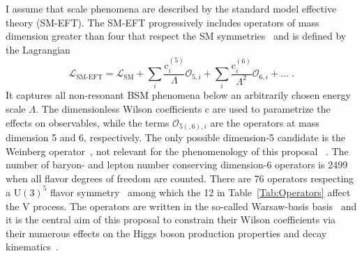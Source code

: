 \documentclass[a4paper,11pt]{article}
\renewcommand{\PV}{{{{V}}}\xspace}
\newcommand{\VH}{{{\PV}{\PH}}\xspace}
\begin{document}
I assume that \TeV scale phenomena are described by the standard model effective theory (SM-EFT). 
The SM-EFT progressively includes operators of mass dimension greater than four that respect the SM symmetries~\cite{Jenkins:2013zja,Alonso:2013hga,Jenkins:2013wua,Englert:2014cva,Brivio:2017vri} and is defined by the Lagrangian
\begin{equation}
\mathcal{L}_{\text{SM-EFT}} = \mathcal{L}_{\text{SM}} +  {\sum}_{i} \frac{\text{c}_i^{\left(5\right)}}{\Lambda} \mathcal{O}_{5,i} + {\sum}_{i} \frac{\text{c}_i^{\left(6\right)}}{{\Lambda}^{2}} \mathcal{O}_{6,i} + ... \;.
\label{Eq:SMEFT}
\end{equation}
It captures all non-resonant BSM phenomena below an arbitrarily chosen energy scale $\Lambda$.
The dimensionless Wilson coefficients $\text{c}$ are used to parametrize the effects on observables, while the terms $\mathcal{O}_{5(,6),i}$ are  the operators at mass dimension 5 and 6, respectively.
The only possible dimension-5 candidate is the  Weinberg operator~\cite{PhysRevLett.43.1566}, not relevant for the phenomenology of this proposal ~\cite{Bonnet:2009ej}.
The number of baryon- and lepton number conserving dimension-6 operators is 2499 when all flavor degrees of freedom are counted. There are 76 operators respecting a $\textrm{U}(3)^5$ flavor symmetry~\cite{Alonso:2013hga} among which the 12 in Table~\ref{Tab:Operators} affect the \VH process.
The operators are written in the so-called Warsaw-basis basis~\cite{Grzadkowski:2010es} and it is the central aim of this proposal to constrain their Wilson coefficients via their numerous effects on the Higgs boson production properties and decay kinematics~\cite{Hagiwara:1993qt,Ellis:2014dva,Murphy:2017omb,Baglio:2020oqu}.
\end{document}

